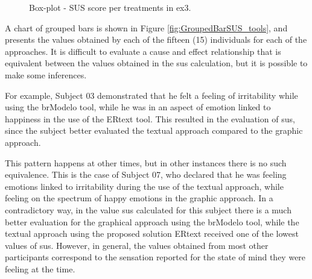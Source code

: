 \begin{figure}[!htb]
    \centering
    \caption{Box-plot - SUS score per treatments in \ac{ex3}.}
    \label{fig:BoxPlotSUS_tools}
    
\end{figure}

A chart of grouped bars is shown in Figure \ref{fig:GroupedBarSUS_tools}, and presents the values obtained by each of the fifteen (15) individuals for each of the approaches.
It is difficult to evaluate a cause and effect relationship that is equivalent between the values obtained in the \ac{sus} calculation, but it is possible to make some inferences.

For example, Subject 03 demonstrated that he felt a feeling of irritability while using the brModelo tool, while he was in an aspect of emotion linked to happiness in the use of the ERtext tool.
This resulted in the evaluation of \ac{sus}, since the subject better evaluated the textual approach compared to the graphic approach.

This pattern happens at other times, but in other instances there is no such equivalence.
This is the case of Subject 07, who declared that he was feeling emotions linked to irritability during the use of the textual approach, while feeling on the spectrum of happy emotions in the graphic approach.
In a contradictory way, in the value \ac{sus} calculated for this subject there is a much better evaluation for the graphical approach using the brModelo tool, while the textual approach using the proposed solution ERtext received one of the lowest values of \ac{sus}.
However, in general, the values obtained from most other participants correspond to the sensation reported for the state of mind they were feeling at the time.

